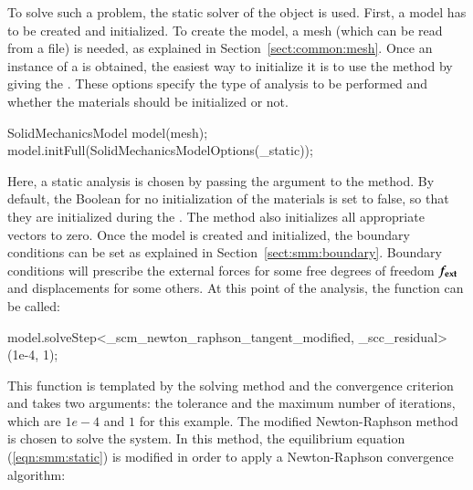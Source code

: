 To solve such a problem, the static solver of the
 object is used.
First, a model has to be created and initialized.  To create the
model, a mesh (which can be read from a file) is needed, as explained
in Section~\ref{sect:common:mesh}.  Once an instance of a
 is obtained, the easiest way to initialize
it is to use the 
method by giving the . These options
specify the type of analysis to be performed and whether the materials
should be initialized or not.
\begin{cpp}
SolidMechanicsModel model(mesh);
model.initFull(SolidMechanicsModelOptions(_static));
\end{cpp}
Here, a static analysis is chosen by passing the argument
 to the method. By default, the Boolean for no
initialization of the materials is set to false, so that they are
initialized during the . The method 
also initializes all appropriate vectors to zero.  Once the model is
created and initialized, the boundary conditions can be set as
explained in Section~\ref{sect:smm:boundary}.  Boundary conditions
will prescribe the external forces for some free degrees of freedom
$\boldsymbol{f_{{\mathrm{ext}}}}$ and displacements for some others.  At this point
of the analysis, the function
 can be called:
\begin{cpp}
model.solveStep<_scm_newton_raphson_tangent_modified, _scc_residual>(1e-4, 1);
\end{cpp}
This function is templated by the solving method and the convergence
criterion and takes two arguments: the tolerance and the maximum
number of iterations, which are $1e-4$ and $1$ for this example. The
modified Newton-Raphson method is chosen to solve the system. In this
method, the equilibrium equation (\ref{eqn:smm:static}) is modified in
order to apply a Newton-Raphson convergence algorithm:

